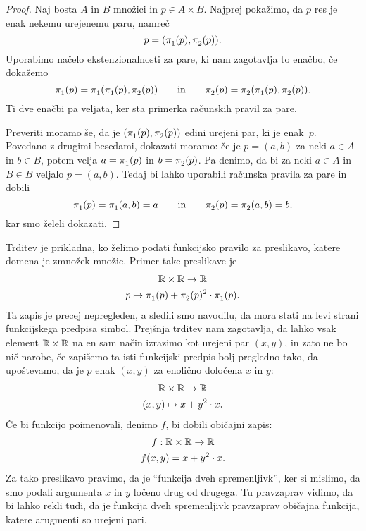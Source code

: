 \begin{proof}
  Naj bosta $A$ in $B$ množici in $p \in A \times B$. Najprej pokažimo, da $p$ res je enak
  nekemu urejenemu paru, namreč
  \begin{equation*}
    p = (\fst(p), \snd(p)).
  \end{equation*}
  Uporabimo načelo ekstenzionalnosti za pare, ki nam zagotavlja to enačbo, če dokažemo
  \begin{equation*}
    \fst(p) = \fst(\fst(p), \snd(p))
    \qquad\text{in}\qquad
    \snd(p) = \snd(\fst(p), \snd(p)).
  \end{equation*}
  Ti dve enačbi pa veljata, ker sta primerka računskih pravil za pare.

  Preveriti moramo še, da je $(\fst(p), \snd(p))$ edini urejeni par, ki je enak~$p$.
  Povedano z drugimi besedami, dokazati moramo: če je $p = (a, b)$ za neki $a \in A$ in
  $b \in B$, potem velja $a = \fst(p)$ in $b = \snd(p)$. Pa denimo, da bi za neki
  $a \in A$ in $B \in B$ veljalo $p = (a,b)$. Tedaj bi lahko uporabili računska pravila za
  pare in dobili
  \begin{equation*}
    \fst(p) = \fst(a, b) = a
    \qquad\text{in}\qquad
    \snd(p) = \snd(a, b) = b,
  \end{equation*}
  kar smo želeli dokazati.
\end{proof}

Trditev je prikladna, ko želimo podati funkcijsko pravilo za preslikavo, katere domena je
zmnožek množic. Primer take preslikave je
%
\begin{gather*}
  \RR \times \RR \to \RR \\
  p \mapsto \fst(p) + \snd(p)^2 \cdot \fst(p).
\end{gather*}
%
Ta zapis je precej nepregleden, a sledili smo navodilu, da mora stati na levi strani
funkcijskega predpisa simbol. Prejšnja trditev nam zagotavlja, da lahko vsak element
$\mathbb{R} \times \mathbb{R}$ na en sam način izrazimo kot urejeni par $(x, y)$, in zato ne bo nič
narobe, če zapišemo ta isti funkcijski predpis bolj pregledno tako, da upoštevamo, da
je $p$ enak $(x, y)$ za enolično določena $x$ in $y$:
%
\begin{gather*}
  \mathbb{R} \times \mathbb{R} \to \mathbb{R} \\
  (x, y) \mapsto x + y^2 \cdot x.
\end{gather*}
%
Če bi funkcijo poimenovali, denimo $f$, bi dobili običajni zapis:
%
\begin{gather*}
  f : \mathbb{R} \times \mathbb{R} \to \mathbb{R} \\
  f(x, y) = x + y^2 \cdot x.
\end{gather*}
%
Za tako preslikavo pravimo, da je ``funkcija dveh spremenljivk'', ker si mislimo, da smo
podali argumenta $x$ in $y$ ločeno drug od drugega. Tu pravzaprav vidimo, da bi lahko
rekli tudi, da je funkcija dveh spremenljivk pravzaprav običajna funkcija, katere
arugmenti so urejeni pari.

